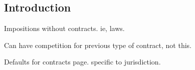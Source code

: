 
\subsection{Introduction}

Impositions without contracts. ie, laws.

Can have competition for previous type of contract, not this.

Defaults for contracts page. specific to jurisdiction.


